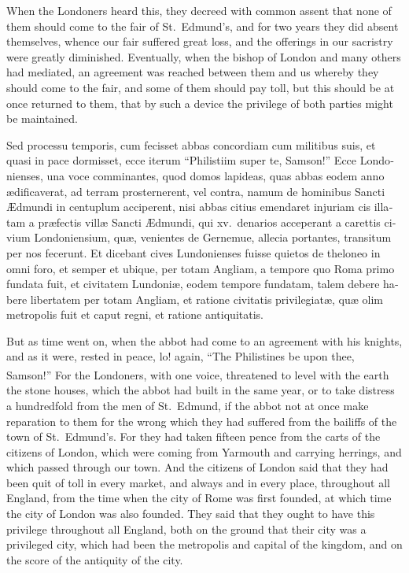 \documentclass[10pt]{book}
\newcounter{engnote}
\newcommand{\engnotenum}{\textsuperscript{\arabic{engnote}\stepcounter{engnote}}}
\newcommand{\engnotetext}[1]{\vphantom{\footnotemark{}}\footnotetext{#1}}
\begin{document}
\begin{paracol}{2}
\switchcolumn

When the Londoners heard this, they decreed with common assent that none of them should come to the fair of St.\ Edmund's, and for two years they did absent themselves, whence our fair suffered great loss, and the offerings in our sacristry were greatly diminished. Eventually, when the bishop of London and many others had mediated, an agreement was reached between them and us whereby they should come to the fair, and some of them should pay toll, but this should be at once returned to them, that by such a device the privilege of both parties might be maintained.

\switchcolumn*

\begin{otherlanguage}{latin}
Sed processu temporis, cum fecisset abbas concordiam cum militibus suis, et quasi in pace dormisset, ecce iterum ``Philistiim super te, Samson!''\engnotetext{Jud.\ xvi., \oldstylenums{9}.} Ecce Londonienses, una voce comminantes, quod domos lapideas, quas abbas eodem anno \ae{}dificaverat, ad terram prosternerent, vel contra, namum de hominibus Sancti \AE{}dmundi in centuplum acciperent, nisi abbas citius emendaret injuriam cis illatam a pr\ae{}fectis vill\ae{} Sancti \AE{}dmundi, qui xv.\ denarios acceperant a carettis civium Londoniensium, qu\ae{}, venientes de Gernemue, allecia portantes, transitum per nos fecerunt. Et dicebant cives Lundonienses fuisse quietos de theloneo in omni foro, et semper et ubique, per totam Angliam, a tempore quo Roma primo fundata fuit, et civitatem Lundoni\ae{}, eodem tempore fundatam, talem debere habere libertatem per totam Angliam, et ratione civitatis privilegiat\ae{}, qu\ae{} olim metropolis fuit et caput regni, et ratione antiquitatis.
\end{otherlanguage}

\switchcolumn

But as time went on, when the abbot had come to an agreement with his knights, and as it were, rested in peace, lo! again, ``The Philistines be upon thee, Samson!''\engnotenum{} For the Londoners, with one voice, threatened to level with the earth the stone houses, which the abbot had built in the same year, or to take distress a hundredfold from the men of St.\ Edmund, if the abbot not at once make reparation to them for the wrong which they had suffered from the bailiffs of the town of St.\ Edmund's. For they had taken fifteen pence from the carts of the citizens of London, which were coming from Yarmouth and carrying herrings, and which passed through our town. And the citizens of London said that they had been quit of toll in every market, and always and in every place, throughout all England, from the time when the city of Rome was first founded, at which time the city of London was also founded. They said that they ought to have this privilege throughout all England, both on the ground that their city was a privileged city, which had been the metropolis and capital of the kingdom, and on the score of the antiquity of the city.


\end{paracol}
\end{document}
